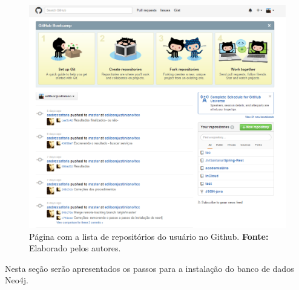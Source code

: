 \newpage
\captionsetup[figure]{list=no}
\begin{figure}[h!]
	\centerline{\includegraphics[scale=0.55]{./imagens/apendices/pagina-home-github.png}}
	\caption[Página com a lista de repositórios do usuário no Github.]
	{Página com a lista de repositórios do usuário no Github. \textbf{Fonte:} Elaborado pelos autores.}
	\label{fig:ap1:pagina_home_github}
\end{figure}

 
Nesta seção serão apresentados os passos para a instalação do banco de dados Neo4j.